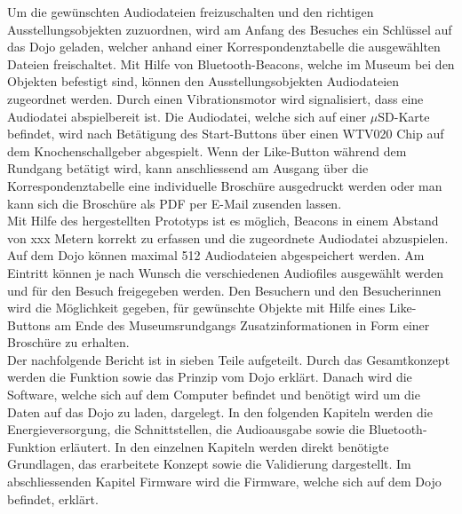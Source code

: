Um die gewünschten Audiodateien freizuschalten und den richtigen Ausstellungsobjekten zuzuordnen, wird am Anfang des Besuches ein Schlüssel auf das Dojo geladen, welcher anhand einer Korrespondenztabelle die ausgewählten Dateien freischaltet. Mit Hilfe von Bluetooth-Beacons, welche im Museum bei den Objekten befestigt sind, können den Ausstellungsobjekten Audiodateien zugeordnet werden. Durch einen Vibrationsmotor wird signalisiert, dass eine Audiodatei abspielbereit ist. Die Audiodatei, welche sich auf einer $\mu$SD-Karte befindet, wird nach Betätigung des Start-Buttons über einen WTV020 Chip auf dem Knochenschallgeber abgespielt. Wenn der Like-Button während dem Rundgang betätigt wird, kann anschliessend am Ausgang über die Korrespondenztabelle eine individuelle Broschüre ausgedruckt werden oder man kann sich die Broschüre als PDF per E-Mail zusenden lassen.\\

Mit Hilfe des hergestellten Prototyps ist es möglich, Beacons in einem Abstand von xxx Metern korrekt zu erfassen und die zugeordnete Audiodatei abzuspielen. Auf dem Dojo können maximal 512 Audiodateien abgespeichert werden. Am Eintritt können je nach Wunsch die verschiedenen Audiofiles ausgewählt werden und für den Besuch freigegeben werden. Den Besuchern und den Besucherinnen wird die Möglichkeit gegeben, für gewünschte Objekte mit Hilfe eines Like-Buttons am Ende des Museumsrundgangs Zusatzinformationen in Form einer Broschüre zu erhalten.\\
 
Der nachfolgende Bericht ist in sieben Teile aufgeteilt. Durch das Gesamtkonzept werden die Funktion sowie das Prinzip vom Dojo erklärt. Danach wird die Software, welche sich auf dem Computer befindet und benötigt wird um die Daten auf das Dojo zu laden, dargelegt. In den folgenden Kapiteln werden die Energieversorgung, die Schnittstellen, die Audioausgabe sowie die Bluetooth-Funktion erläutert. In den einzelnen Kapiteln werden direkt benötigte Grundlagen, das erarbeitete Konzept sowie die Validierung dargestellt. Im abschliessenden Kapitel Firmware wird die Firmware, welche sich auf dem Dojo befindet, erklärt.
